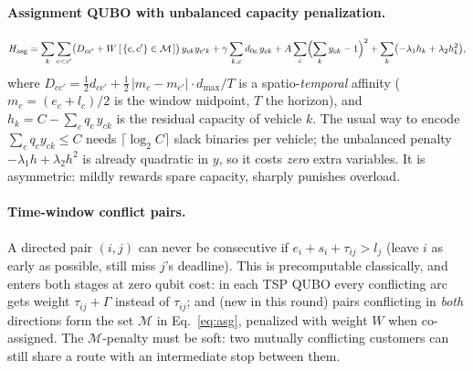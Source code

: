 \documentclass[10pt,a4paper]{article}
\begin{document}
\paragraph{Assignment QUBO with unbalanced capacity penalization.}
\begin{equation}
H_{\mathrm{asg}} = \sum_{k}\sum_{c<c'}\bigl(D_{cc'} + W\,[\,\{c,c'\}\in\mathcal{M}\,]\bigr)\,y_{ck}y_{c'k}
+ \gamma\sum_{k,c} d_{0c}\,y_{ck}
+ A\sum_{c}\Bigl(\sum_{k}y_{ck}-1\Bigr)^{2}
+ \sum_{k}\bigl(-\lambda_1 h_k + \lambda_2 h_k^2\bigr),
\label{eq:asg}
\end{equation}
where $D_{cc'} = \tfrac12 d_{cc'} + \tfrac12\,|m_c-m_{c'}|\cdot d_{\max}/T$ is a
spatio-\emph{temporal} affinity ($m_c=(e_c+l_c)/2$ is the window midpoint, $T$
the horizon), and $h_k = C - \sum_c q_c\,y_{ck}$ is the residual capacity of
vehicle $k$. The usual way to encode $\sum_c q_c y_{ck}\le C$ needs
$\lceil\log_2 C\rceil$ slack binaries per vehicle; the unbalanced penalty
$-\lambda_1 h + \lambda_2 h^2$ is already quadratic in $y$, so it costs
\emph{zero} extra variables. It is asymmetric: mildly rewards spare capacity,
sharply punishes overload.

\paragraph{Time-window conflict pairs.} A directed pair $(i,j)$ can never be
consecutive if $e_i + s_i + \tau_{ij} > l_j$ (leave $i$ as early as possible,
still miss $j$'s deadline). This is precomputable classically, and enters both
stages at zero qubit cost: in each TSP QUBO every conflicting arc gets weight
$\tau_{ij} + \Gamma$ instead of $\tau_{ij}$; and (new in this round) pairs
conflicting in \emph{both} directions form the set $\mathcal{M}$ in
Eq.~\eqref{eq:asg}, penalized with weight $W$ when co-assigned. The
$\mathcal{M}$-penalty must be soft: two mutually conflicting customers can
still share a route with an intermediate stop between them.
\end{document}
